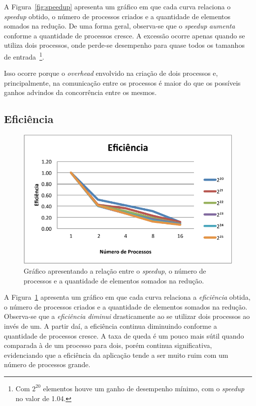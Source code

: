 \documentclass[12pt,a4paper]{article}
\begin{document}
A Figura~\ref{fig:speedup} apresenta um gráfico em que cada curva relaciona o
\textit{speedup} obtido, o número de processos criados e a quantidade de
elementos somados na redução. De uma forma geral, observa-se que o
\textit{speedup} \emph{aumenta} conforme a quantidade de processos cresce. A
excessão ocorre apenas quando se utiliza dois processos, onde perde-se
desempenho para quase todos os tamanhos de entrada~\footnote{Com $2^{20}$
elementos houve um ganho de desempenho mínimo, com o \textit{speedup} no valor
de 1.04.}.

Isso ocorre porque o \textit{overhead} envolvido na criação de dois processos e,
principalmente, na comunicação entre os processos é maior do que os possíveis
ganhos advindos da concorrência entre os mesmos.

\subsection{Eficiência}

\begin{figure}[h!]
\centering
\includegraphics{img/efficiency.pdf}
\caption{Gráfico apresentando a relação entre o \textit{speedup}, o número de
processos e a quantidade de elementos somados na redução.}
\label{fig:efficiency}
\end{figure}

A Figura~\ref{fig:efficiency} apresenta um gráfico em que cada curva relaciona a
\textit{eficiência} obtida, o número de processos criados e a quantidade de
elementos somados na redução. Observa-se que a \textit{eficiência}
\emph{diminui} drasticamente ao se utilizar dois processos ao invés de um. A
partir daí, a eficiência continua diminuindo conforme a quantidade de processos
cresce. A taxa de queda é um pouco mais sútil quando comparada à de um processo
para dois, porém continua significativa, evidenciando que a eficiência da
aplicação tende a ser muito ruim com um número de processos grande.
\end{document}
